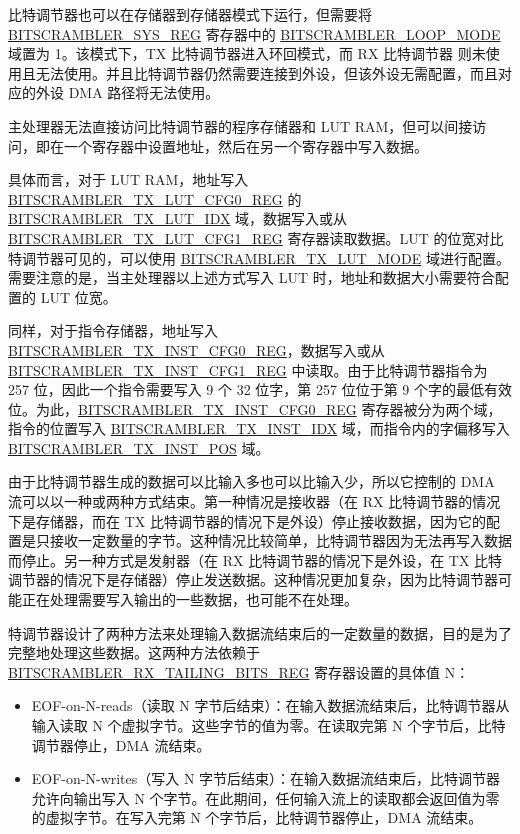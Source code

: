 \documentclass[main\_\_CN.tex]{subfiles}
\begin{document}
比特调节器也可以在存储器到存储器模式下运行，但需要将 \hyperref[regdesc:BITSCRAMBLERSYSREG]{BITSCRAMBLER\_SYS\_REG} 寄存器中的 \hyperref[fielddesc:BITSCRAMBLERLOOPMODE]{BITSCRAMBLER\_LOOP\_MODE} 域置为 1。该模式下，TX 比特调节器进入环回模式，而 RX 比特调节器 则未使用且无法使用。并且比特调节器仍然需要连接到外设，但该外设无需配置，而且对应的外设 DMA 路径将无法使用。

主处理器无法直接访问比特调节器的程序存储器和 LUT RAM，但可以间接访问，即在一个寄存器中设置地址，然后在另一个寄存器中写入数据。

具体而言，对于 LUT RAM，地址写入 \hyperref[regdesc:BITSCRAMBLERTXLUTCFG0REG]{BITSCRAMBLER\_TX\_LUT\_CFG0\_REG} 的 \hyperref[fielddesc:BITSCRAMBLERTXLUTIDX]{BITSCRAMBLER\_TX\_LUT\_IDX} 域，数据写入或从 \hyperref[regdesc:BITSCRAMBLERTXLUTCFG1REG]{BITSCRAMBLER\_TX\_LUT\_CFG1\_REG} 寄存器读取数据。LUT 的位宽对比特调节器可见的，可以使用 \hyperref[fielddesc:BITSCRAMBLERTXLUTMODE]{BITSCRAMBLER\_TX\_LUT\_MODE} 域进行配置。需要注意的是，当主处理器以上述方式写入 LUT 时，地址和数据大小需要符合配置的 LUT 位宽。

同样，对于指令存储器，地址写入 \hyperref[regdesc:BITSCRAMBLERTXINSTCFG0REG]{BITSCRAMBLER\_TX\_INST\_CFG0\_REG}，数据写入或从 \hyperref[regdesc:BITSCRAMBLERTXINSTCFG1REG]{BITSCRAMBLER\_TX\_INST\_CFG1\_REG} 中读取。由于比特调节器指令为 257 位，因此一个指令需要写入 9 个 32 位字，第 257 位位于第 9 个字的最低有效位。为此，\hyperref[regdesc:BITSCRAMBLERTXINSTCFG0REG]{BITSCRAMBLER\_TX\_INST\_CFG0\_REG} 寄存器被分为两个域，指令的位置写入 \hyperref[fielddesc:BITSCRAMBLERTXINSTIDX]{BITSCRAMBLER\_TX\_INST\_IDX} 域，而指令内的字偏移写入 \hyperref[fielddesc:BITSCRAMBLERTXINSTPOS]{BITSCRAMBLER\_TX\_INST\_POS} 域。


由于比特调节器生成的数据可以比输入多也可以比输入少，所以它控制的 DMA 流可以以一种或两种方式结束。第一种情况是接收器（在 RX 比特调节器的情况下是存储器，而在 TX 比特调节器的情况下是外设）停止接收数据，因为它的配置是只接收一定数量的字节。这种情况比较简单，比特调节器因为无法再写入数据而停止。另一种方式是发射器（在 RX 比特调节器的情况下是外设，在 TX 比特调节器的情况下是存储器）停止发送数据。这种情况更加复杂，因为比特调节器可能正在处理需要写入输出的一些数据，也可能不在处理。

\chipname{} 特调节器设计了两种方法来处理输入数据流结束后的一定数量的数据，目的是为了完整地处理这些数据。这两种方法依赖于 \hyperref[regdesc:BITSCRAMBLERRXTAILINGBITSREG]{BITSCRAMBLER\_RX\_TAILING\_BITS\_REG} 寄存器设置的具体值 N：


\begin{itemize}
\item EOF-on-N-reads（读取 N 字节后结束）：在输入数据流结束后，比特调节器从输入读取 N 个虚拟字节。这些字节的值为零。在读取完第 N 个字节后，比特调节器停止，DMA 流结束。

\item EOF-on-N-writes（写入 N 字节后结束）：在输入数据流结束后，比特调节器允许向输出写入 N 个字节。在此期间，任何输入流上的读取都会返回值为零的虚拟字节。在写入完第 N 个字节后，比特调节器停止，DMA 流结束。
\end{itemize}
\end{document}
